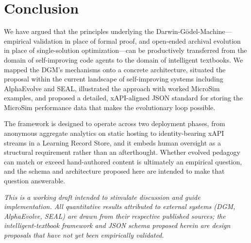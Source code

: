 \section{Conclusion}

We have argued that the principles underlying the Darwin-G\"{o}del-Machine---empirical
validation in place of formal proof, and open-ended archival evolution in place
of single-solution optimization---can be productively transferred from the
domain of self-improving code agents to the domain of intelligent textbooks.
We mapped the DGM's mechanisms onto a concrete architecture, situated the
proposal within the current landscape of self-improving systems including
AlphaEvolve and SEAL, illustrated the approach with worked MicroSim examples,
and proposed a detailed, xAPI-aligned JSON standard for storing the MicroSim
performance data that makes the evolutionary loop possible.

The framework is designed to operate across two deployment phases, from
anonymous aggregate analytics on static hosting to identity-bearing xAPI
streams in a Learning Record Store, and it embeds human oversight as a
structural requirement rather than an afterthought. Whether evolved pedagogy
can match or exceed hand-authored content is ultimately an empirical question,
and the schema and architecture proposed here are intended to make that
question answerable.

\bigskip
\noindent\textit{This is a working draft intended to stimulate discussion and
guide implementation. All quantitative results attributed to external systems
(DGM, AlphaEvolve, SEAL) are drawn from their respective published sources;
the intelligent-textbook framework and JSON schema proposed herein are design
proposals that have not yet been empirically validated.}
